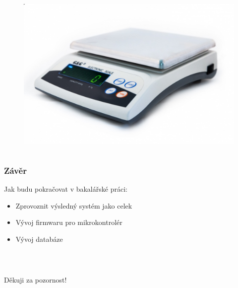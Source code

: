 \documentclass[%
  12pt,       				%
	t,                  %
	aspectratio=1610,   %
	unicode,						%
]{beamer}				    	%
\begin{document}
\begin{frame}
\begin{columns}[T]
\begin{column}{0.6\textwidth}
\begin{figure}
                \includegraphics[width=0.7\columnwidth]{obrazky/E3000.png}
			\end{figure}
		\end{column}
	\end{columns}											%
\end{frame}

\begin{frame} 
	\frametitle{Závěr}
    Jak budu pokračovat v bakalářské práci:
    \begin{itemize}
                \item Zprovoznit výsledný systém jako celek
				\item Vývoj firmwaru pro mikrokontrolér
				\item Vývoj databáze
			\end{itemize}
    
\end{frame}

\begin{frame}[c] 
	\frametitle{\mbox{ }}
	\begin{center}
		{\Huge Děkuji za pozornost!}
	\end{center}
\end{frame}
\end{document}
